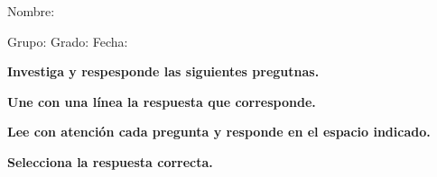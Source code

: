 \documentclass[10pt,addpoints]{exam}
\begin{document}
Nombre:\enspace\hrulefill

\vspace{5mm}

Grupo:\enspace\hrulefill
\enspace{}Grado:\enspace\hrulefill
\enspace{}Fecha:\enspace\hrulefill

\begin{questions}

\begin{EnvFullwidth}
  \sffamily\textbf{Investiga y respesponde las siguientes pregutnas.}
\end{EnvFullwidth}








\newpage





\begin{EnvFullwidth}
  \sffamily\textbf{Une con una línea la respuesta que corresponde.}
\end{EnvFullwidth}



\begin{EnvFullwidth}
  \sffamily\textbf{Lee con atención cada pregunta y responde en
  el espacio indicado. }
\end{EnvFullwidth}


\vspace{\baselineskip}


\vspace{\baselineskip}



\vspace{\baselineskip}




\begin{EnvFullwidth}
  \sffamily\textbf{Selecciona la respuesta correcta. }
\end{EnvFullwidth}

\vspace{\baselineskip}

\vspace{\baselineskip}





\newpage



\newpage




\end{questions}
\end{document}
